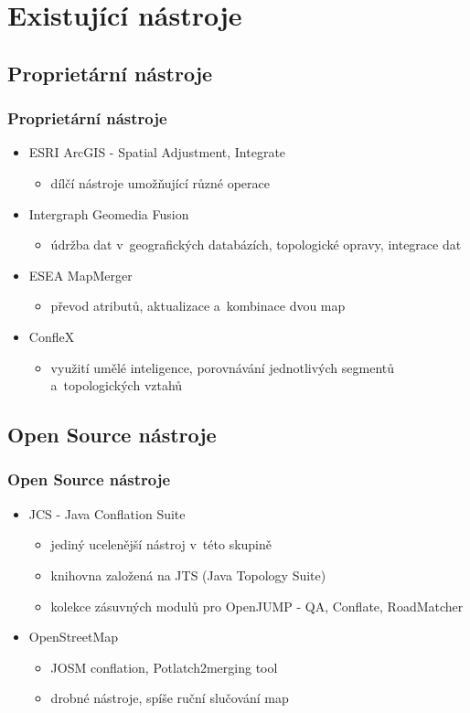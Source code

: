 \documentclass[unicode,bookmarksnumbered]{beamer}
\begin{document}
\section{Existující nástroje} %

  \subsection{Proprietární nástroje}
  \begin{frame}
    \frametitle{Proprietární nástroje}
     \begin{itemize}
      \item ESRI ArcGIS - Spatial Adjustment, Integrate
	  \begin{itemize}
	    \item dílčí nástroje umožňující různé operace
	  \end{itemize}
      \item Intergraph Geomedia Fusion
	  \begin{itemize}
	    \item údržba dat v~geografických databázích, topologické opravy, 
		  integrace dat
	  \end{itemize}
      \item ESEA MapMerger
	  \begin{itemize}
	    \item převod atributů, aktualizace a~kombinace dvou map
	  \end{itemize}
      \item ConfleX
	  \begin{itemize}
	    \item využití umělé inteligence, porovnávání jednotlivých segmentů
		  a~topologických vztahů
	  \end{itemize}
     \end{itemize}
  \end{frame}

  \subsection{Open Source nástroje}
  \begin{frame}
    \frametitle{Open Source nástroje}
	\begin{itemize}
	  \item JCS - Java Conflation Suite
	      \begin{itemize}
		\item jediný ucelenější nástroj v~této skupině
		\item knihovna založená na JTS (Java Topology Suite)
		\item kolekce zásuvných modulů pro OpenJUMP - QA, Conflate, RoadMatcher
	      \end{itemize}
	  \item OpenStreetMap
	      \begin{itemize}
		\item JOSM conflation, Potlatch2merging tool
		\item drobné nástroje, spíše ruční slučování map
	      \end{itemize}
	\end{itemize} 
  \end{frame}
\end{document}
